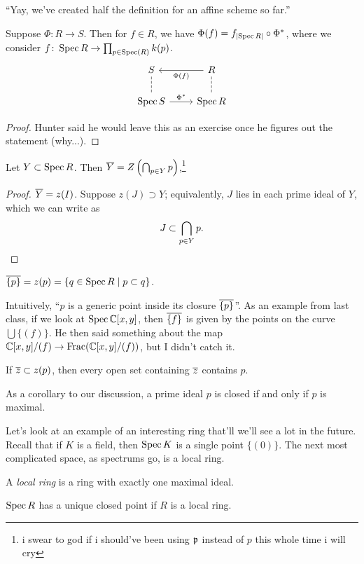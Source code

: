 {\color{airforceblue} ``Yay, we've created half the definition for an affine scheme so far.''}

{\color{crimson} \begin{theorem} %
    Suppose $\Phi \colon R \to S$. Then for $f \in R$, we have $\Phi(f) = f_{\left\lvert \operatorname{Spec} R \right\rvert} \circ \Phi^\ast$, where we consider $f \colon \operatorname{Spec} R \to \prod_{p \in \operatorname{Spec}(R)} k(p)$.
    \[ \begin{tikzcd}
        S \arrow[d, dashed, no head] & R \arrow[l, "\Phi(f)"] \arrow[d, dashed, no head] \\
        \Spec S \arrow[r, "\Phi^\ast"] & \Spec R
    \end{tikzcd} \]
\end{theorem}
\begin{proof}
    Hunter said he would leave this as an exercise once he figures out the statement (why...).
\end{proof}}

\begin{theorem} \label{thm:closure_of_set_in_spec}
    Let $Y \subset \operatorname{Spec} R$. Then $\overline Y = Z \left(\bigcap_{p \in Y} p\right)$,\footnote{i swear to god if i should've been using $\mathfrak p$ instead of $p$ this whole time i will cry}
\end{theorem}
\begin{proof}
    $\overline Y = z(I)$. Suppose $z(J) \supset Y$; equivalently, $J$ lies in each prime ideal of $Y$, which we can write as
    \[ J \subset \bigcap_{p \in Y} p. \qedhere \]
\end{proof}
\begin{corollary} \label{cor:closure_of_prime_ideal_in_spec}
    $\overline{\{p\}} = z(p) = \{q \in \operatorname{Spec} R \mid p \subset q\}$.
\end{corollary}
Intuitively, ``$p$ is a generic point inside its closure $\overline{\{p\}}$''. As an example from last class, if we look at $\operatorname{Spec} \mathbb C[x, y]$, then $\overline{\{f\}}$ is given by the points on the curve $\bigcup \{(f)\}$. He then said something about the map $\mathbb C[x, y]/(f) \to \operatorname{Frac}(\mathbb C[x, y] / (f))$, but I didn't catch it.

\begin{corollary}
    If $\overline z \subset z(p)$, then every open set containing $\overline z$ contains $p$.
\end{corollary}

As a corollary to our discussion, a prime ideal $p$ is closed if and only if $p$ is maximal.

\newpage
Let's look at an example of an interesting ring that'll we'll see a lot in the future. Recall that if $K$ is a field, then $\operatorname{Spec} K$ is a single point $\{(0)\}$. The next most complicated space, as spectrums go, is a local ring.
\begin{definition} \label{defn:local_ring}
    A \textit{local ring} is a ring with exactly one maximal ideal.
\end{definition}
\begin{corollary} \label{cor:spec_of_local_ring}
    $\operatorname{Spec} R$ has a unique closed point if $R$ is a local ring.
\end{corollary}

